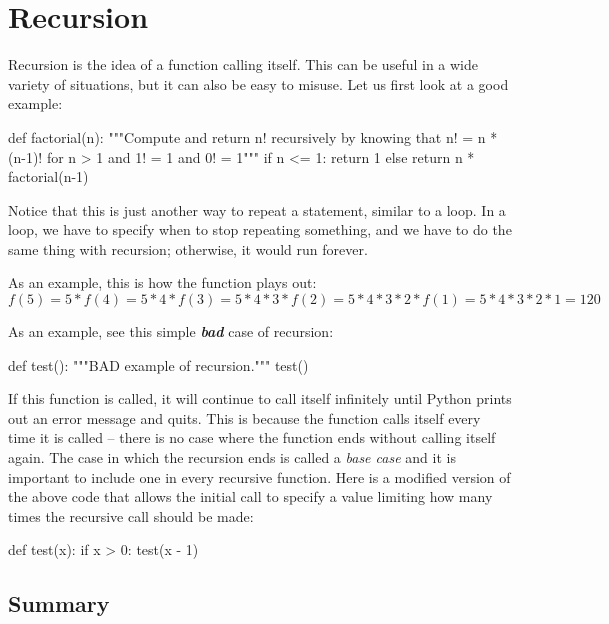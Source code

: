 \documentclass[11pt]{cselabheader}
\begin{document}
\pagebreak
\section{Recursion}
\label{sec:rec}

Recursion is the idea of a function calling itself. This can be useful in a wide
variety of situations, but it can also be easy to misuse. Let us first look at a
good example:
\begin{python3code}
def factorial(n):
    """Compute and return n! recursively by knowing that n! = n * (n-1)! for n > 1
    and 1! = 1 and 0! = 1"""
    if n <= 1:
        return 1
    else
        return n * factorial(n-1)
\end{python3code}

Notice that this is just another way to repeat a statement, similar to a loop.
In a loop, we have to specify when to stop repeating something, and we have to
do the same thing with recursion; otherwise, it would run forever.

As an example, this is how the function plays out:
\[ f(5) = 5 * f(4) = 5 * 4 * f(3) = 5 * 4 * 3 * f(2) = 5 * 4 * 3 * 2 * f(1) = 5
* 4 * 3 * 2 * 1 = 120 \]

As an example, see this simple \textbf{\emph{bad}} case of recursion:

\begin{python3code}
def test():
    """BAD example of recursion."""
    test()
\end{python3code}

If this function is called, it will continue to call itself infinitely until
Python prints out an error message and quits. This is because the function calls
itself every time it is called -- there is no case where the function ends
without calling itself again. The case in which the recursion ends is called a
\emph{base case} and it is important to include one in every recursive function.
Here is a modified version of the above code that allows the initial call to
specify a value limiting how many times the recursive call should be made:

\begin{python3code}
def test(x):
    if x > 0:
        test(x - 1)
\end{python3code}

\subsection{Summary}
\label{subsec:adv.sum}
\end{document}
